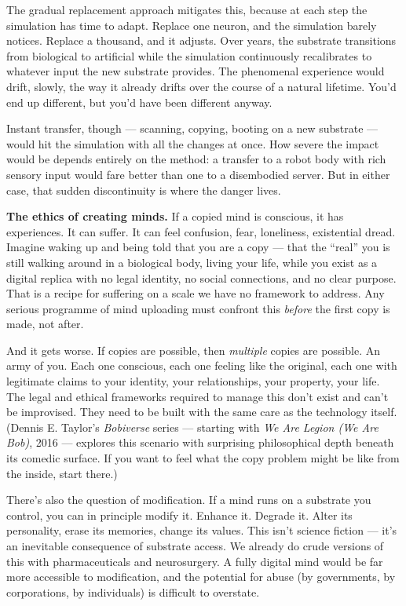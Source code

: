 \documentclass[11pt, twoside, openright]{book}
\begin{document}
The gradual replacement approach mitigates this, because at each step the simulation has time to adapt. Replace one neuron, and the simulation barely notices. Replace a thousand, and it adjusts. Over years, the substrate transitions from biological to artificial while the simulation continuously recalibrates to whatever input the new substrate provides. The phenomenal experience would drift, slowly, the way it already drifts over the course of a natural lifetime. You'd end up different, but you'd have been different anyway.

Instant transfer, though --- scanning, copying, booting on a new substrate --- would hit the simulation with all the changes at once. How severe the impact would be depends entirely on the method: a transfer to a robot body with rich sensory input would fare better than one to a disembodied server. But in either case, that sudden discontinuity is where the danger lives.

\textbf{The ethics of creating minds.} If a copied mind is conscious, it has experiences. It can suffer. It can feel confusion, fear, loneliness, existential dread. Imagine waking up and being told that you are a copy --- that the ``real'' you is still walking around in a biological body, living your life, while you exist as a digital replica with no legal identity, no social connections, and no clear purpose. That is a recipe for suffering on a scale we have no framework to address. Any serious programme of mind uploading must confront this \textit{before} the first copy is made, not after.

And it gets worse. If copies are possible, then \textit{multiple} copies are possible. An army of you. Each one conscious, each one feeling like the original, each one with legitimate claims to your identity, your relationships, your property, your life. The legal and ethical frameworks required to manage this don't exist and can't be improvised. They need to be built with the same care as the technology itself. (Dennis E. Taylor's \textit{Bobiverse} series --- starting with \textit{We Are Legion (We Are Bob)}, 2016 --- explores this scenario with surprising philosophical depth beneath its comedic surface. If you want to feel what the copy problem might be like from the inside, start there.)

There's also the question of modification. If a mind runs on a substrate you control, you can in principle modify it. Enhance it. Degrade it. Alter its personality, erase its memories, change its values. This isn't science fiction --- it's an inevitable consequence of substrate access. We already do crude versions of this with pharmaceuticals and neurosurgery. A fully digital mind would be far more accessible to modification, and the potential for abuse (by governments, by corporations, by individuals) is difficult to overstate.
\end{document}
